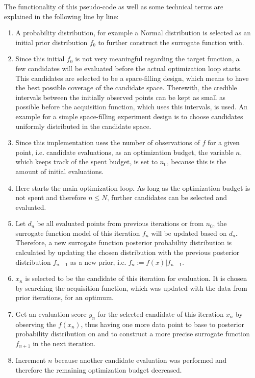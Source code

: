The functionality of this pseudo-code as well as some technical terms are explained in the following line by line:
\begin{enumerate}
    \item A probability distribution, for example a Normal distribution is selected as an initial prior distribution $f_0$ to further construct the surrogate function with.
    \item Since this initial $f_0$ is not very meaningful regarding the target function, a few candidates will be evaluated before the actual optimization loop starts.
    This candidates are selected to be a space-filling design, which means to have the best possible coverage of the candidate space.
    Therewith, the credible intervals between the initially observed points can be kept as small as possible before the acquisition function, which uses this intervals, is used.
    An example for a simple space-filling experiment design is to choose candidates uniformly distributed in the candidate space.
    \item Since this implementation uses the number of observations of $f$ for a given point, i.e. candidate evaluations, as an optimization budget, the variable $n$, which keeps track of the spent budget, is set to $n_0$, because this is the amount of initial evaluations.
    \item Here starts the main optimization loop.
    As long as the optimization budget is not spent and therefore $n \leq N$, further candidates can be selected and evaluated.
    \item Let $d_n$ be all evaluated points from previous iterations or from $n_0$, the surrogate function model of this iteration $f_n$ will be updated based on $d_n$.
    Therefore, a new surrogate function posterior probability distribution is calculated by updating the chosen distribution with the previous posterior distribution $f_{n-1}$ as a new prior, i.e. $f_n := f(x)|f_{n-1}$.
    \item $x_n$ is selected to be the candidate of this iteration for evaluation. It is chosen by searching the acquisition function, which was updated with the data from prior iterations, for an optimum.
    \item Get an evaluation score $y_n$ for the selected candidate of this iteration $x_n$ by observing the $f(x_n)$, thus having one more data point to base to posterior probability distribution on and to construct a more precise surrogate function $f_{n+1}$ in the next iteration.
    \item Increment $n$ because another candidate evaluation was performed and therefore the remaining optimization budget decreased.

\end{enumerate}
